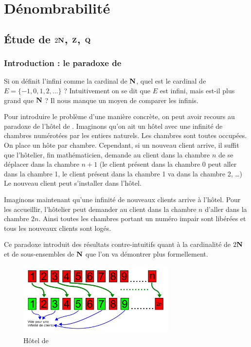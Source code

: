 \documentclass[a4paper,french,final]{memoir}
\begin{document}
\part{Dénombrabilité}
\chapter{\texorpdfstring{\'Etude de $2\mathbf{N}$, $\mathbf{Z}$, $\mathbf{Q}$}{Dénombrabilité : Étude de N,2N,Z, et Q}}
\section{Introduction : le paradoxe de }

Si on définit l'infini comme la cardinal de $\mathbf{N}$, quel est le cardinal de $E= \{-1, 0, 1, 2, \dots\}$ ? Intuitivement on se dit que $E$ est infini, mais est-il plus grand que $\mathbf{N}$ ? Il nous manque un moyen de comparer les infinis.

Pour introduire le problème d'une manière concrète, on peut avoir recours au paradoxe de l'hôtel de . Imaginons qu'on ait un hôtel avec une infinité de chambres numérotées par les entiers naturels. Les chambres sont toutes occupées. On place un hôte par chambre. Cependant, si un nouveau client arrive, il suffit que l'hôtelier, fin mathématicien, demande au client dans la chambre $n$ de se déplacer dans la chambre $n+1$ (le client présent dans la chambre 0 peut aller dans la chambre 1, le client présent dans la chambre 1 va dans la chambre 2, \dots) Le nouveau client peut s'installer dans l'hôtel.

Imaginons maintenant qu'une infinité de nouveaux clients arrive à l'hôtel. Pour les accueillir, l'hôtelier peut demander au client dans la chambre $n$ d'aller dans la chambre $2n$. Ainsi toutes les chambres portant un numéro impair sont libérées et tous les nouveaux clients sont logés.

Ce paradoxe introduit des résultats contre-intuitifs quant à la cardinalité de $2 \mathbf{N}$ et de sous-ensembles de $\mathbf{N}$ que l'on va démontrer plus formellement.

\begin{figure}[htb]
    \centering
    \includegraphics[width=0.7\textwidth,keepaspectratio]{hotel de hilbert.png}
    \caption{Hôtel de }
    \label{fig:hotel_hilbert}
\end{figure}
\clearpage
\end{document}
